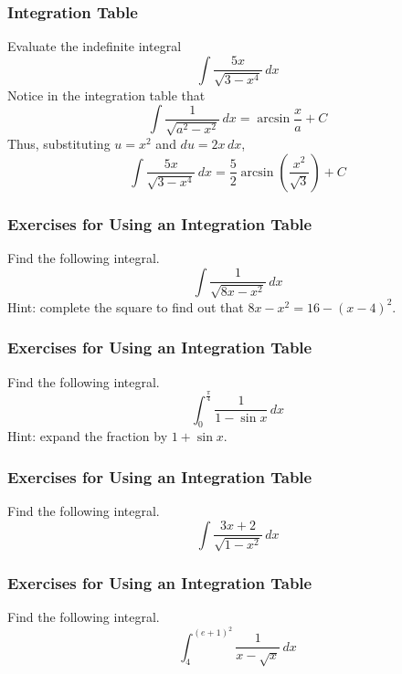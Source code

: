 \documentclass[xcolor=dvipsnames]{beamer}
\begin{document}
\begin{frame}
  \frametitle{Integration Table}
   Evaluate the indefinite integral
  \begin{equation}
    \label{eq:aigeishu}
    \int\frac{5x}{\sqrt{3-x^{4}}}\,dx
  \end{equation}
Notice in the integration table that
\begin{equation}
  \label{eq:zeecogoo}
  \int\frac{1}{\sqrt{a^{2}-x^{2}}}\,dx=\arcsin\frac{x}{a}+C
\end{equation}
Thus, substituting $u=x^{2}$ and $du=2x\,dx$,
\begin{equation}
  \label{eq:roogheis}
  \int\frac{5x}{\sqrt{3-x^{4}}}\,dx=\frac{5}{2}\arcsin\left(\frac{x^{2}}{\sqrt{3}}\right)+C
\end{equation}
\end{frame}

\begin{frame}
  \frametitle{Exercises for Using an Integration Table}
  {\ubung} Find the following integral.
  \begin{equation}
    \label{eq:ohjomopu}
    \int\frac{1}{\sqrt{8x-x^{2}}}\,dx
  \end{equation}
  Hint: complete the square to find out that $8x-x^{2}=16-(x-4)^{2}$.
\end{frame}

\begin{frame}
  \frametitle{Exercises for Using an Integration Table}
  {\ubung} Find the following integral.
  \begin{equation}
    \label{eq:feecheir}
    \int_{0}^{\frac{\pi}{4}}\frac{1}{1-\sin{}x}\,dx
  \end{equation}
  Hint: expand the fraction by $1+\sin{}x$.
\end{frame}

\begin{frame}
  \frametitle{Exercises for Using an Integration Table}
  {\ubung} Find the following integral.
  \begin{equation}
    \label{eq:dahcohne}
    \int\frac{3x+2}{\sqrt{1-x^{2}}}\,dx
  \end{equation}
\end{frame}

\begin{frame}
  \frametitle{Exercises for Using an Integration Table}
  {\ubung} Find the following integral.
  \begin{equation}
    \label{eq:uokaivie}
    \int_{4}^{(e+1)^{2}}\frac{1}{x-\sqrt{x}}\,dx
  \end{equation}
\end{frame}
\end{document}
